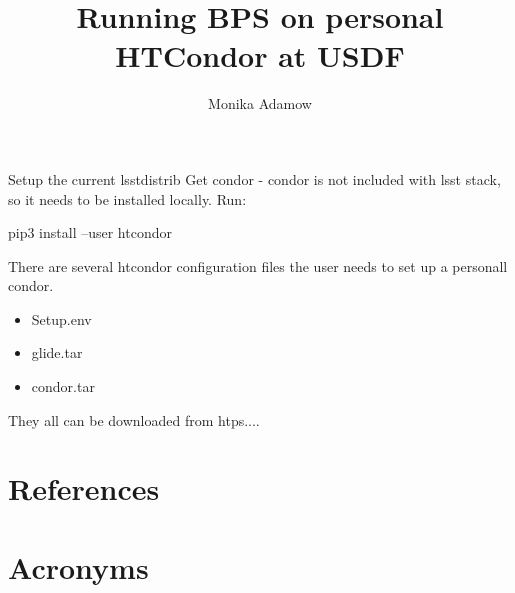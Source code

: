 \documentclass[OPS,authoryear,toc]{lsstdoc}
\title{Running BPS on personal HTCondor at USDF}
\author{%
Monika Adamow
}
\date{\vcsDate}
\begin{document}
\maketitle


Setup the current lsstdistrib
Get condor - condor is not included with lsst stack,  so it needs to be installed locally. 
Run:

 pip3 install --user htcondor
 
 There are several htcondor configuration files the user needs to set up a personall condor.
 \begin{itemize}
 \item Setup.env
 \item glide.tar
 \item condor.tar
 \end{itemize}
They all can be downloaded from htps....


\appendix
\section{References} \label{sec:bib}
\renewcommand{\refname}{} %


\section{Acronyms} \label{sec:acronyms}

\end{document}
